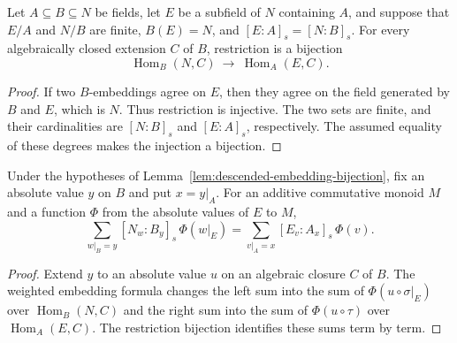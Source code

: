 \begin{lemma}
\label{lem:descended-embedding-bijection}
\leanok
{}
Let $A\subseteq B\subseteq N$ be fields, let $E$ be a subfield of $N$
containing $A$, and suppose that $E/A$ and $N/B$ are finite,
$B(E)=N$, and $[E:A]_s=[N:B]_s$. For every algebraically closed
extension $C$ of $B$, restriction is a bijection
\[
 \operatorname{Hom}_B(N,C)\ \longrightarrow\ \operatorname{Hom}_A(E,C).
\]
\end{lemma}
\begin{proof}
If two $B$-embeddings agree on $E$, then they agree on the field
generated by $B$ and $E$, which is $N$. Thus restriction is injective.
The two sets are finite, and their cardinalities are $[N:B]_s$ and
$[E:A]_s$, respectively. The assumed equality of these degrees makes
the injection a bijection.
\end{proof}

\begin{lemma}
\label{lem:descended-weighted-sums}
\leanok
{}
Under the hypotheses of Lemma~\ref{lem:descended-embedding-bijection},
fix an absolute value $y$ on $B$ and put $x=y|_A$. For an additive
commutative monoid $M$ and a function $\Phi$ from the absolute values
of $E$ to $M$,
\[
 \sum_{w|_B=y}[N_w:B_y]_s\,\Phi(w|_E)
 =
 \sum_{v|_A=x}[E_v:A_x]_s\,\Phi(v).
\]
\end{lemma}
\begin{proof}
Extend $y$ to an absolute value $u$ on an algebraic closure $C$ of $B$.
The weighted embedding formula changes the left sum into the sum of
$\Phi(u\circ\sigma|_E)$ over $\operatorname{Hom}_B(N,C)$ and the right
sum into the sum of $\Phi(u\circ\tau)$ over $\operatorname{Hom}_A(E,C)$.
The restriction bijection identifies these sums term by term.
\end{proof}

